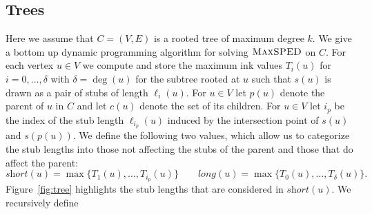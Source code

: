 \documentclass[a4paper,english,numberwithinsect]{eurocg18}
\newcommand{\maxsped}{\ensuremath{\textsc{MaxSPED}}\xspace}
\newcommand{\sollong}{\ensuremath{\textit{long}}\xspace}
\newcommand{\solshort}{\ensuremath{\textit{short}}\xspace}
\begin{document}
\subsection{Trees}
\label{sec:tree}


Here we assume that $ C =(V,E) $ is a rooted tree of maximum degree $ k $. 
We give a bottom up dynamic programming algorithm for solving \maxsped on $ C $. 
For each vertex $u \in V$ we compute and store the maximum ink values $T_i(u)$ for $i = 0, \dots, \delta$ with $\delta = \deg(u)$ for the subtree rooted at $u$ such that $s(u)$ is drawn as a pair of stubs of length $\ell_i(u)$.
For $ u \in V $ let $ p(u) $ denote the parent of $ u $ in $ C $ and let $ c(u) $ denote the set of its children. 
For $ u \in V $  %
let $ i_p $ be the index of the stub length $\ell_{i_p}(u)$ induced by the intersection point of $s(u)$ and $s(p(u))$.
We define the following two values, which allow us to categorize the stub lengths into those not affecting the stubs of the parent and those that do affect the parent:
\[	
	\solshort(u) = \max\{T_1(u),\dots,T_{i_p}(u)\} \qquad
	\sollong(u) = \max\{T_0(u),\dots,T_{\delta}(u)\}.
\]
Figure~\ref{fig:tree} highlights the stub lengths that are considered in $\solshort(u)$. We recursively define %
\end{document}
